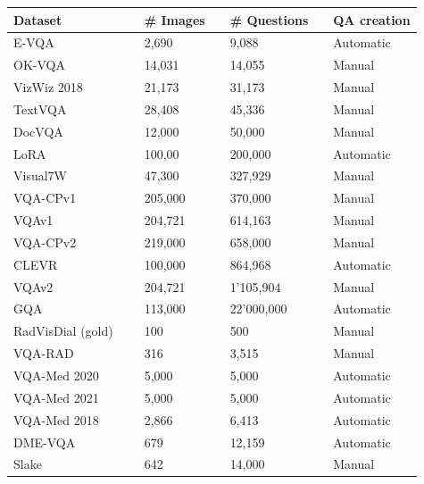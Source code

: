 \begin{table}[ht]
\begin{center}
\begin{tabular}{lp{0.5cm}lp{0.5cm}lp{0.5cm}l}
\toprule
Dataset                       && \# Images         && \# Questions && QA creation \\ \midrule
E-VQA~\cite{yang2023event} && 2,690 && 9,088 && Automatic \\
OK-VQA~\cite{marino2019okvqa}   && 14,031           && 14,055 && Manual \\
VizWiz 2018~\cite{gurari2018vizwiz} && 21,173 && 31,173 && Manual \\
TextVQA~\cite{singh2019towards}   && 28,408           && 45,336 && Manual\\ 
DocVQA~\cite{mathew2021docvqa}   && 12,000           && 50,000 && Manual \\
LoRA~\cite{gao2024lora} && 100,00 && 200,000 && Automatic\\
Visual7W~\cite{zhu2016visual7w}  && 47,300 && 327,929 && Manual \\ 
VQA-CPv1~\cite{agrawal2018don}   && 205,000           && 370,000  && Manual\\
VQAv1~\cite{antol2015vqa}      && 204,721    && 614,163    && Manual  \\ 
VQA-CPv2~\cite{agrawal2018don}   && 219,000          && 658,000  && Manual\\
CLEVR~\cite{johnson2017clevr}   && 100,000 && 864,968   && Automatic \\ 
VQAv2~\cite{goyal2017making}   && 204,721 && 1'105,904 && Manual \\ 
GQA~\cite{hudson2019gqa}  && 113,000           && 22'000,000   &&  Automatic \\ \midrule
RadVisDial (gold)~\cite{kovaleva2020towards}  && 100 && 500 &&  Manual \\ 
VQA-RAD~\cite{lau2018dataset}  && 316 && 3,515 && Manual \\ 
VQA-Med 2020~\cite{ImageCLEF-VQA-Med2020}  && 5,000    &&  5,000 &&  Automatic   \\  
VQA-Med 2021~\cite{ImageCLEF-VQA-Med2021}  && 5,000 && 5,000 && Automatic \\ 
VQA-Med 2018~\cite{ImageCLEFVQA_Med2018} && 2,866    &&   6,413  && Automatic   \\  
DME-VQA~\cite{tascon2022consistency} && 679 && 12,159 && Automatic \\
Slake~\cite{liu2021slake}  && 642 && 14,000 && Manual \\

\end{tabular}
\end{center}
\end{table}

